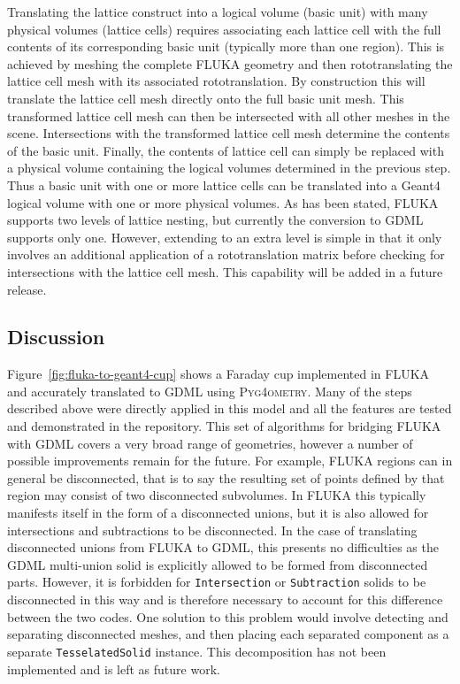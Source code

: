 \documentclass[final,5p,times,twocolumn]{elsarticle}
\newcommand{\pyinline}[1]{\lstinline[postbreak={}]{#1}}
\newcommand{\PYGEOMETRY}{\textsc{Pyg4ometry}}
\begin{document}
Translating the lattice construct into a logical volume (basic unit) with
many physical volumes (lattice cells) requires associating each lattice
cell with the full contents of its corresponding basic unit (typically more
than one region). This is achieved by meshing the complete FLUKA geometry
and then rototranslating the lattice cell mesh with its associated
rototranslation. By construction this will translate the lattice cell mesh
directly onto the full basic unit mesh. This transformed lattice cell mesh
can then be intersected with all other meshes in the scene.  Intersections
with the transformed lattice cell mesh determine the contents of the basic
unit.  Finally, the contents of lattice cell can simply be replaced with a physical
volume containing the logical volumes determined in the previous step.
Thus a basic unit with one or more lattice cells can be translated into a
Geant4 logical volume with one or more physical volumes. As has been
stated, FLUKA supports two levels of lattice nesting, but currently the
conversion to GDML supports only one. However, extending to an extra level
is simple in that it only involves an additional application of a
rototranslation matrix before checking for intersections with the lattice
cell mesh.  This capability will be added in a future release.

\subsection{Discussion}

Figure~\ref{fig:fluka-to-geant4-cup} shows a Faraday cup implemented in
FLUKA and accurately translated to GDML using \PYGEOMETRY{}.  Many of the
steps described above were directly applied in this model and all the
features are tested and demonstrated in the repository.  This set of
algorithms for bridging FLUKA with GDML covers a very broad range of
geometries, however a number of possible improvements remain for the
future.
For example, FLUKA regions can in general be disconnected, that is
to say the resulting set of points defined by that region may consist of
two disconnected subvolumes.  In FLUKA this typically manifests itself in
the form of a disconnected unions, but it is also allowed for intersections
and subtractions to be disconnected.  In the case of translating
disconnected unions from FLUKA to GDML, this presents no difficulties as
the GDML multi-union solid is explicitly allowed to be formed from
disconnected parts.  However, it is forbidden for \pyinline{Intersection} or
\pyinline{Subtraction} solids to be disconnected in this way and is
therefore necessary to account for this difference between the two codes.
One solution to this problem would involve detecting and separating
disconnected meshes, and then placing each separated component as a
separate \pyinline{TesselatedSolid} instance.  This decomposition has not
been implemented and is left as future work.
\end{document}
